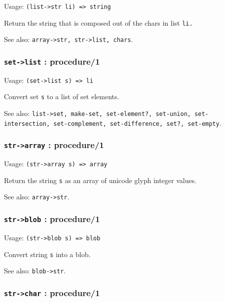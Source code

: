 \documentclass[
]{article}
\newcommand{\passthrough}[1]{#1}
\begin{document}
Usage: \passthrough{\lstinline!(list->str li) => string!}

Return the string that is composed out of the chars in list
\passthrough{\lstinline!li.!}

See also: \passthrough{\lstinline!array->str, str->list, chars!}.

\hypertarget{set-list-procedure1}{%
\subsubsection{\texorpdfstring{\texttt{set-\textgreater{}list} :
procedure/1}{set-\textgreater list : procedure/1}}\label{set-list-procedure1}}

Usage: \passthrough{\lstinline!(set->list s) => li!}

Convert set \passthrough{\lstinline!s!} to a list of set elements.

See also:
\passthrough{\lstinline!list->set, make-set, set-element?, set-union, set-intersection, set-complement, set-difference, set?, set-empty!}.

\hypertarget{str-array-procedure1}{%
\subsubsection{\texorpdfstring{\texttt{str-\textgreater{}array} :
procedure/1}{str-\textgreater array : procedure/1}}\label{str-array-procedure1}}

Usage: \passthrough{\lstinline!(str->array s) => array!}

Return the string \passthrough{\lstinline!s!} as an array of unicode
glyph integer values.

See also: \passthrough{\lstinline!array->str!}.

\hypertarget{str-blob-procedure1}{%
\subsubsection{\texorpdfstring{\texttt{str-\textgreater{}blob} :
procedure/1}{str-\textgreater blob : procedure/1}}\label{str-blob-procedure1}}

Usage: \passthrough{\lstinline!(str->blob s) => blob!}

Convert string \passthrough{\lstinline!s!} into a blob.

See also: \passthrough{\lstinline!blob->str!}.

\hypertarget{str-char-procedure1}{%
\subsubsection{\texorpdfstring{\texttt{str-\textgreater{}char} :
procedure/1}{str-\textgreater char : procedure/1}}\label{str-char-procedure1}}
\end{document}
